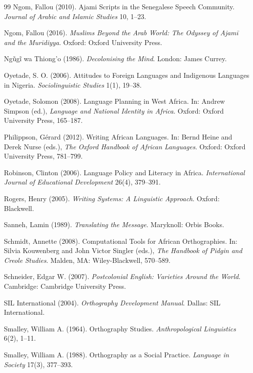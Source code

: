 \documentclass[12pt]{article}
\begin{document}
\begin{thebibliography}{99}
Ngom, Fallou (2010).
Ajami Scripts in the Senegalese Speech Community.
\textit{Journal of Arabic and Islamic Studies} 10, 1--23.

Ngom, Fallou (2016).
\textit{Muslims Beyond the Arab World: The Odyssey of \textit{Ajam\={i}} and the Mur\={i}diyya}.
Oxford: Oxford University Press.

Ngũgĩ wa Thiong'o (1986).
\textit{Decolonising the Mind}.
London: James Currey.

Oyetade, S. O. (2006).
Attitudes to Foreign Languages and Indigenous Languages in Nigeria.
\textit{Sociolinguistic Studies} 1(1), 19--38.

Oyetade, Solomon (2008).
Language Planning in West Africa.
In: Andrew Simpson (ed.),
\textit{Language and National Identity in Africa}.
Oxford: Oxford University Press, 165--187.

Philippson, Gérard (2012).
Writing African Languages.
In: Bernd Heine and Derek Nurse (eds.),
\textit{The Oxford Handbook of African Languages}.
Oxford: Oxford University Press, 781--799.

Robinson, Clinton (2006).
Language Policy and Literacy in Africa.
\textit{International Journal of Educational Development} 26(4), 379--391.

Rogers, Henry (2005).
\textit{Writing Systems: A Linguistic Approach}.
Oxford: Blackwell.

Sanneh, Lamin (1989).
\textit{Translating the Message}.
Maryknoll: Orbis Books.

Schmidt, Annette (2008).
Computational Tools for African Orthographies.
In: Silvia Kouwenberg and John Victor Singler (eds.),
\textit{The Handbook of Pidgin and Creole Studies}.
Malden, MA: Wiley-Blackwell, 570--589.

Schneider, Edgar W. (2007).
\textit{Postcolonial English: Varieties Around the World}.
Cambridge: Cambridge University Press.

SIL International (2004).
\textit{Orthography Development Manual}.
Dallas: SIL International.

Smalley, William A. (1964).
Orthography Studies.
\textit{Anthropological Linguistics} 6(2), 1--11.

Smalley, William A. (1988).
Orthography as a Social Practice.
\textit{Language in Society} 17(3), 377--393.


\end{thebibliography}
\end{document}
